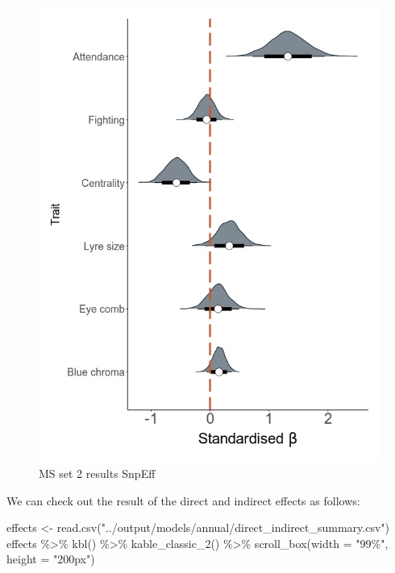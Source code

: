 \documentclass[
  letterpaper,
  DIV=11,
  numbers=noendperiod]{scrreprt}
\newenvironment{Shaded}{}{}
\newcommand{\AttributeTok}[1]{\textcolor[rgb]{0.84,0.23,0.29}{#1}}
\newcommand{\FunctionTok}[1]{\textcolor[rgb]{0.44,0.26,0.76}{#1}}
\newcommand{\NormalTok}[1]{\textcolor[rgb]{0.14,0.16,0.18}{#1}}
\newcommand{\OtherTok}[1]{\textcolor[rgb]{0.44,0.26,0.76}{#1}}
\newcommand{\SpecialCharTok}[1]{\textcolor[rgb]{0.00,0.36,0.77}{#1}}
\newcommand{\StringTok}[1]{\textcolor[rgb]{0.01,0.18,0.38}{#1}}
\begin{document}
\begin{figure}

{\centering \includegraphics{qmd/../plots/sup/extended_4_high_right_traits_ams.png}

}

\caption{MS set 2 results SnpEff}

\end{figure}

We can check out the result of the direct and indirect effects as
follows:

\begin{Shaded}
\begin{Highlighting}[]
\NormalTok{effects }\OtherTok{\textless{}{-}} \FunctionTok{read.csv}\NormalTok{(}\StringTok{"../output/models/annual/direct\_indirect\_summary.csv"}\NormalTok{)}
\NormalTok{effects }\SpecialCharTok{\%\textgreater{}\%} \FunctionTok{kbl}\NormalTok{() }\SpecialCharTok{\%\textgreater{}\%}  \FunctionTok{kable\_classic\_2}\NormalTok{() }\SpecialCharTok{\%\textgreater{}\%} \FunctionTok{scroll\_box}\NormalTok{(}\AttributeTok{width =} \StringTok{"99\%"}\NormalTok{, }\AttributeTok{height =} \StringTok{"200px"}\NormalTok{)}
\end{Highlighting}
\end{Shaded}
\end{document}
